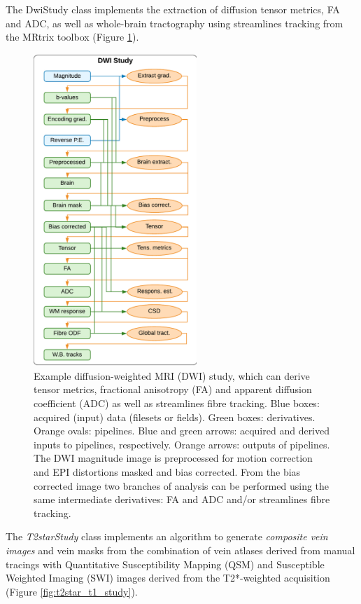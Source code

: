 \documentclass[smallextended]{svjour3}       %
\begin{document}
The DwiStudy class implements the extraction of diffusion tensor metrics,
FA and ADC, as well as whole-brain tractography using streamlines tracking from the MRtrix
toolbox \citep{tournier_improved_2010,tournier_mrtrix:_2012} (Figure \ref{fig:dwi_study}).

\begin{figure}
	\centering
    \includegraphics[width=0.55\textwidth]{../figures/dwi_study}
  \caption{Example diffusion-weighted MRI (DWI) study, which can derive
tensor metrics, fractional anisotropy (FA) and apparent diffusion
coefficient (ADC) as well as streamlines fibre tracking. Blue boxes:
acquired (input) data (filesets or fields). Green boxes: derivatives.
Orange ovals: pipelines. Blue and green arrows: acquired and derived
inputs to pipelines, respectively. Orange arrows: outputs of pipelines.
The DWI magnitude image is preprocessed for motion correction and EPI
distortions masked and bias corrected. From the bias corrected image two
branches of analysis can be performed using the same intermediate
derivatives: FA and ADC and/or streamlines fibre tracking.}
\label{fig:dwi_study}
\end{figure}

The \emph{T2starStudy} class implements an algorithm to generate
\emph{composite vein images} \citep{ward_combining_2018} and
vein masks \citep{ward_vein_2017} from the combination of
vein atlases derived from manual tracings with Quantitative
Susceptibility Mapping (QSM) and Susceptible Weighted Imaging (SWI)
images derived from the T2*-weighted acquisition (Figure \ref{fig:t2star_t1_study}).
\end{document}
